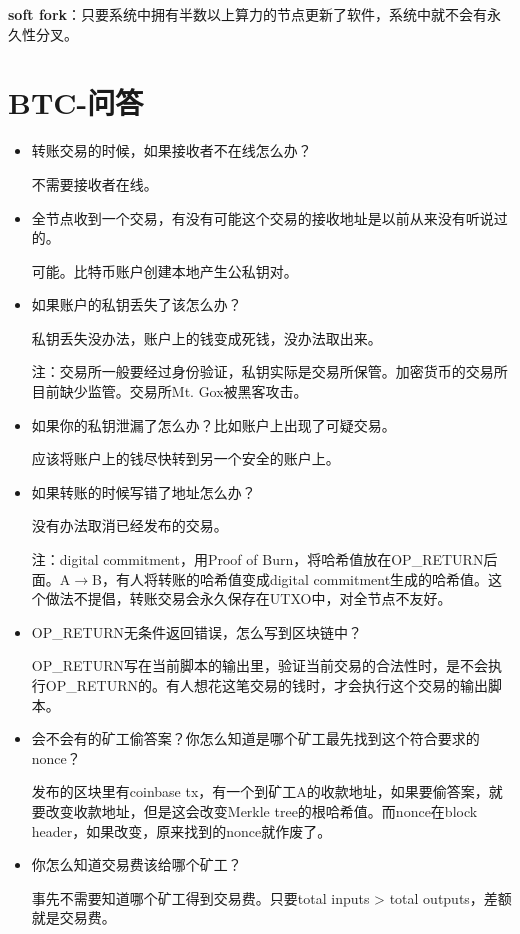 \documentclass[10pt]{ctexart}
\begin{document}
\textbf{soft fork}：只要系统中拥有半数以上算力的节点更新了软件，系统中就不会有永久性分叉。

\section{BTC-问答}
\begin{itemize}
    \item 转账交易的时候，如果接收者不在线怎么办？
        
    不需要接收者在线。
    \item 全节点收到一个交易，有没有可能这个交易的接收地址是以前从来没有听说过的。
    
    可能。比特币账户创建本地产生公私钥对。
    \item 如果账户的私钥丢失了该怎么办？
    
    私钥丢失没办法，账户上的钱变成死钱，没办法取出来。

    注：交易所一般要经过身份验证，私钥实际是交易所保管。加密货币的交易所目前缺少监管。交易所Mt. Gox被黑客攻击。
    \item 如果你的私钥泄漏了怎么办？比如账户上出现了可疑交易。
    
    应该将账户上的钱尽快转到另一个安全的账户上。

    \item 如果转账的时候写错了地址怎么办？
    
    没有办法取消已经发布的交易。

    注：digital commitment，用Proof of Burn，将哈希值放在OP\_RETURN后面。A$\rightarrow$B，有人将转账的哈希值变成digital commitment生成的哈希值。这个做法不提倡，转账交易会永久保存在UTXO中，对全节点不友好。

    \item OP\_RETURN无条件返回错误，怎么写到区块链中？
    
    OP\_RETURN写在当前脚本的输出里，验证当前交易的合法性时，是不会执行OP\_RETURN的。有人想花这笔交易的钱时，才会执行这个交易的输出脚本。

    \item 会不会有的矿工偷答案？你怎么知道是哪个矿工最先找到这个符合要求的nonce？
    
    发布的区块里有coinbase tx，有一个到矿工A的收款地址，如果要偷答案，就要改变收款地址，但是这会改变Merkle tree的根哈希值。而nonce在block header，如果改变，原来找到的nonce就作废了。

    \item 你怎么知道交易费该给哪个矿工？
    
    事先不需要知道哪个矿工得到交易费。只要total inputs > total outputs，差额就是交易费。
\end{itemize}
 
\end{document}
